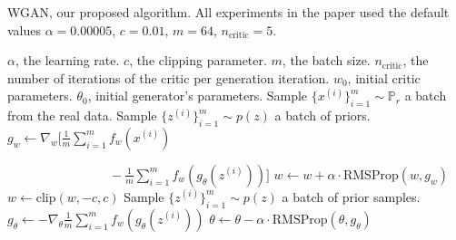 \documentclass[twocolumn]{article}
\begin{document}
\begin{algorithm}
\small
\caption{WGAN, our proposed algorithm. All experiments in the paper used the default values $\alpha=0.00005$, $c=0.01$, $m=64$, $n_{\mathrm{critic}}=5$.}\label{alg:cap}
\begin{algorithmic}[1]
\Require $\alpha$, the learning rate. $c$, the clipping parameter. $m$, the batch size. $n_{\text{critic}}$, the number of iterations of the critic per generation iteration.
\Require $w_0$, initial critic parameters. $\theta_0$, initial generator's parameters.
\State Sample $\{x^{(i)}\}^m_{i=1}\sim\mathbb{P}_r$ a batch from the real data.
\State Sample $\{z^{(i)}\}^m_{i=1}\sim p(z)$ a batch of priors.
\State $g_w\leftarrow\nabla_w[\frac1m\sum_{i=1}^mf_w(x^{(i)})$

$\hspace{8em}-\frac1m\sum_{i=1}^mf_w(g_\theta(z^{(i)}))]$
\State $w\leftarrow w+\alpha\cdot\text{RMSProp}(w,g_w)$
\State $w\leftarrow\text{clip}(w,-c,c)$
\EndFor
\State Sample $\{z^{(i)}\}^m_{i=1}\sim p(z)$ a batch of prior samples.
\State $g_\theta\leftarrow-\nabla_\theta\frac1m\sum_{i=1}^mf_w(g_\theta(z^{(i)}))$
\State $\theta\leftarrow\theta-\alpha\cdot\text{RMSProp}(\theta,g_\theta)$
\EndWhile
\end{algorithmic}
\end{algorithm}
\end{document}
